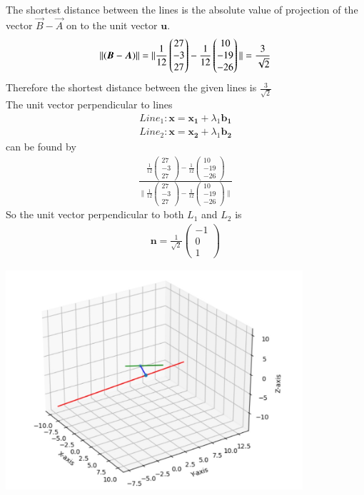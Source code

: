 \documentclass[journal,12pt,twocolumn]{IEEEtran}
\newcommand{\norm}[1]{\| #1 \|}
\begin{document}
The shortest distance between the lines is the absolute value of projection of the vector $\vec{B}-\vec{A}$ on to the unit vector $\bm{u}$.
\begin{equation}
    \norm{(\bm{B}-\bm{A})}\\
    =\norm{\frac{1}{{12}}\begin{pmatrix}27\\-3\\27\end{pmatrix}-\frac{1}{{12}}\begin{pmatrix}10\\-19\\-26\end{pmatrix}}\\
    =\frac{3}{\sqrt{2}}
\end{equation}
Therefore the shortest distance between the given lines is $\frac{3}{\sqrt{2}}$\\
The unit vector perpendicular to lines \\
\begin{align}
    Line_1\colon \bm{x}=\bm{x_1}+\lambda_1\bm{b_1}\\
    Line_2\colon \bm{x}=\bm{x_2}+\lambda_1\bm{b_2}
\end{align}
can be found by 
\begin{align}
    \frac{\frac{1}{{12}}\begin{pmatrix}27\\-3\\27\end{pmatrix}-\frac{1}{{12}}\begin{pmatrix}10\\-19\\-26\end{pmatrix}}{\norm{\frac{1}{{12}}\begin{pmatrix}27\\-3\\27\end{pmatrix}-\frac{1}{{12}}\begin{pmatrix}10\\-19\\-26\end{pmatrix}}}
\end{align}
So the unit vector perpendicular to both $L_1$ and $L_2$ is
\begin{align}
    \bm{n}=\frac{1}{\sqrt{2}}\begin{pmatrix}-1\\0\\1\end{pmatrix}
\end{align}

\begin{center}
    \includegraphics[width=11cm]{assignment2.jpg}
\end{center}
\end{document}
